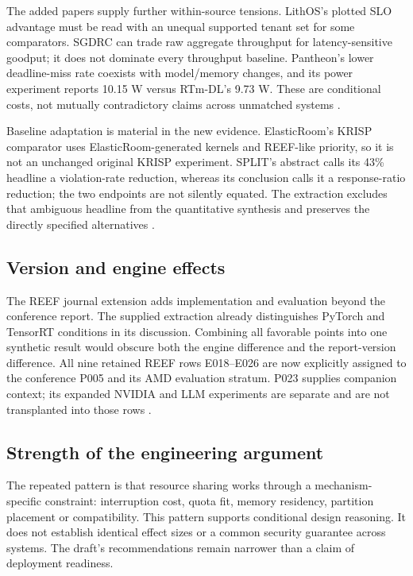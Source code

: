 The added papers supply further within-source tensions. LithOS's plotted SLO advantage must be read with an unequal supported tenant set for some comparators. SGDRC can trade raw aggregate throughput for latency-sensitive goodput; it does not dominate every throughput baseline. Pantheon's lower deadline-miss rate coexists with model/memory changes, and its power experiment reports 10.15 W versus RTm-DL's 9.73 W. These are conditional costs, not mutually contradictory claims across unmatched systems \cite{s021,s024,s025}.

Baseline adaptation is material in the new evidence. ElasticRoom's KRISP comparator uses ElasticRoom-generated kernels and REEF-like priority, so it is not an unchanged original KRISP experiment. SPLIT's abstract calls its 43\% headline a violation-rate reduction, whereas its conclusion calls it a response-ratio reduction; the two endpoints are not silently equated. The extraction excludes that ambiguous headline from the quantitative synthesis and preserves the directly specified alternatives \cite{s028,s029}.

\subsection{Version and engine effects}
The REEF journal extension adds implementation and evaluation beyond the conference report. The supplied extraction already distinguishes PyTorch and TensorRT conditions in its discussion. Combining all favorable points into one synthetic result would obscure both the engine difference and the report-version difference. All nine retained REEF rows E018--E026 are now explicitly assigned to the conference P005 and its AMD evaluation stratum. P023 supplies companion context; its expanded NVIDIA and LLM experiments are separate and are not transplanted into those rows \cite{P005,P023}.

\subsection{Strength of the engineering argument}
The repeated pattern is that resource sharing works through a mechanism-specific constraint: interruption cost, quota fit, memory residency, partition placement or compatibility. This pattern supports conditional design reasoning. It does not establish identical effect sizes or a common security guarantee across systems. The draft's recommendations remain narrower than a claim of deployment readiness.

